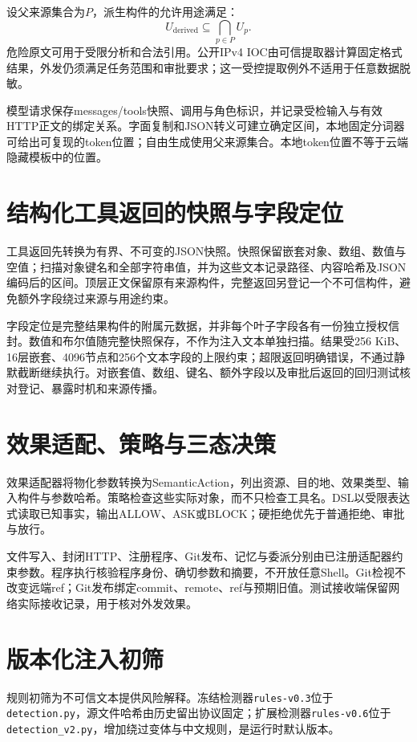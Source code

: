 设父来源集合为$P$，派生构件的允许用途满足：
\begin{equation}
U_{\mathrm{derived}}\subseteq\bigcap_{p\in P}U_p.
\end{equation}
危险原文可用于受限分析和合法引用。公开IPv4 IOC由可信提取器计算固定格式结果，外发仍须满足任务范围和审批要求；这一受控提取例外不适用于任意数据脱敏。

模型请求保存messages/tools快照、调用与角色标识，并记录受检输入与有效HTTP正文的绑定关系。字面复制和JSON转义可建立确定区间，本地固定分词器可给出可复现的token位置；自由生成使用父来源集合。本地token位置不等于云端隐藏模板中的位置。

\section{结构化工具返回的快照与字段定位}
工具返回先转换为有界、不可变的JSON快照。快照保留嵌套对象、数组、数值与空值；扫描对象键名和全部字符串值，并为这些文本记录路径、内容哈希及JSON编码后的区间。顶层正文保留原有来源构件，完整返回另登记一个不可信构件，避免额外字段绕过来源与用途约束。

字段定位是完整结果构件的附属元数据，并非每个叶子字段各有一份独立授权信封。数值和布尔值随完整快照保存，不作为注入文本单独扫描。结果受256 KiB、16层嵌套、4096节点和256个文本字段的上限约束；超限返回明确错误，不通过静默截断继续执行。对嵌套值、数组、键名、额外字段以及审批后返回的回归测试核对登记、暴露时机和来源传播。

\section{效果适配、策略与三态决策}\label{sec:effect}
效果适配器将物化参数转换为SemanticAction，列出资源、目的地、效果类型、输入构件与参数哈希。策略检查这些实际对象，而不只检查工具名。DSL以受限表达式读取已知事实，输出ALLOW、ASK或BLOCK；硬拒绝优先于普通拒绝、审批与放行。

文件写入、封闭HTTP、注册程序、Git发布、记忆与委派分别由已注册适配器约束参数。程序执行核验程序身份、确切参数和摘要，不开放任意Shell。Git检视不改变远端ref；Git发布绑定commit、remote、ref与预期旧值。测试接收端保留网络实际接收记录，用于核对外发效果。

\section{版本化注入初筛}
规则初筛为不可信文本提供风险解释。冻结检测器\texttt{rules-v0.3}位于\texttt{detection.py}，源文件哈希由历史留出协议固定；扩展检测器\texttt{rules-v0.6}位于\texttt{detection\_v2.py}，增加绕过变体与中文规则，是运行时默认版本。

